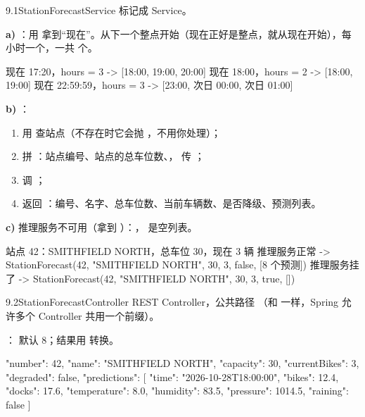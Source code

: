 \begin{task}{9.1\quad StationForecastService}
标记成 Service。

\textbf{a) }：用  拿到“现在”。从下一个整点开始（现在正好是整点，就从现在开始），每小时一个，一共  个。

\begin{example}
\begin{plaincode}
现在 17:20，hours = 3   ->  [18:00, 19:00, 20:00]
现在 18:00，hours = 2   ->  [18:00, 19:00]
现在 22:59:59，hours = 3 ->  [23:00, 次日 00:00, 次日 01:00]
\end{plaincode}
\end{example}

\textbf{b) }：
\begin{enumerate}
  \item 用  查站点（不存在时它会抛 ，不用你处理）；
  \item 拼 ：站点编号、站点的总车位数、， 传 ；
  \item 调 ；
  \item 返回 ：编号、名字、总车位数、当前车辆数、是否降级、预测列表。
\end{enumerate}

\textbf{c)} 推理服务不可用（拿到 ）：， 是空列表。

\begin{example}
\begin{plaincode}
站点 42：SMITHFIELD NORTH，总车位 30，现在 3 辆
推理服务正常   ->  StationForecast(42, "SMITHFIELD NORTH", 30, 3, false, [8 个预测])
推理服务挂了   ->  StationForecast(42, "SMITHFIELD NORTH", 30, 3, true,  [])
\end{plaincode}
\end{example}
\end{task}

\begin{task}{9.2\quad StationForecastController}
REST Controller，公共路径 （和  一样，Spring 允许多个 Controller 共用一个前缀）。

： 默认 8；结果用  转换。

\begin{jsoncode}
{
  "number": 42, "name": "SMITHFIELD NORTH", "capacity": 30, "currentBikes": 3, "degraded": false,
  "predictions": [
    { "time": "2026-10-28T18:00:00", "bikes": 12.4, "docks": 17.6,
      "temperature": 8.0, "humidity": 83.5, "pressure": 1014.5, "raining": false }
  ]
}
\end{jsoncode}
\end{task}

